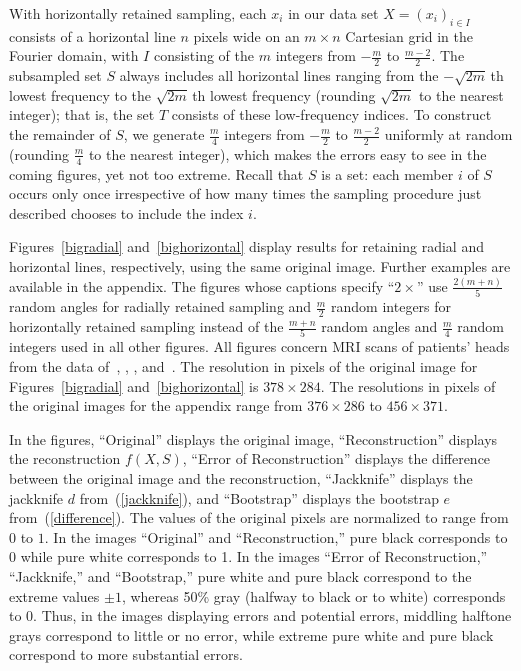 \documentclass{article}
\begin{document}
With horizontally retained sampling,
each $x_i$ in our data set $X = (x_i)_{i \in I}$
consists of a horizontal line $n$ pixels wide on an $m \times n$ Cartesian grid
in the Fourier domain, with $I$ consisting of the $m$ integers
from $-\frac{m}{2}$ to $\frac{m-2}{2}$.
The subsampled set $S$ always includes
all horizontal lines ranging from the $-\sqrt{2m}\,$th lowest frequency
to the $\sqrt{2m}\,$th lowest frequency
(rounding $\sqrt{2m}$ to the nearest integer);
that is, the set $T$ consists of these low-frequency indices.
To construct the remainder of $S$, we generate $\frac{m}{4}$ integers
from $-\frac{m}{2}$ to $\frac{m-2}{2}$ uniformly at random
(rounding $\frac{m}{4}$ to the nearest integer), which makes the errors
easy to see in the coming figures, yet not too extreme.
Recall that $S$ is a set: each member $i$ of $S$
occurs only once irrespective of how many times the sampling procedure
just described chooses to include the index $i$.

Figures~\ref{bigradial} and~\ref{bighorizontal} display results for retaining
radial and horizontal lines, respectively, using the same original image.
Further examples are available in the appendix.
The figures whose captions specify ``$2\times$'' use
$\frac{2(m + n)}{5}$ random angles for radially retained sampling
and $\frac{m}{2}$ random integers for horizontally retained sampling
instead of the $\frac{m + n}{5}$ random angles
and $\frac{m}{4}$ random integers used in all other figures.
All figures concern MRI scans of patients' heads from the data
of~\cite{mri2}, \cite{mri1}, \cite{mri3}, and~\cite{mri4}.
The resolution in pixels of the original image for Figures~\ref{bigradial}
and~\ref{bighorizontal} is $378 \times 284$.
The resolutions in pixels of the original images for the appendix range
from $376 \times 286$ to $456 \times 371$.

In the figures,
``Original'' displays the original image,
``Reconstruction'' displays the reconstruction $f(X, S)$,
``Error of Reconstruction'' displays the difference between the original image
and the reconstruction,
``Jackknife'' displays the jackknife $d$ from~(\ref{jackknife}),
and ``Bootstrap'' displays the bootstrap $e$ from~(\ref{difference}).
The values of the original pixels are normalized to range from $0$ to $1$.
In the images ``Original'' and ``Reconstruction,''
pure black corresponds to 0 while pure white corresponds to 1.
In the images ``Error of Reconstruction,'' ``Jackknife,'' and ``Bootstrap,''
pure white and pure black correspond to the extreme values $\pm 1$,
whereas 50\% gray (halfway to black or to white) corresponds to 0.
Thus, in the images displaying errors and potential errors,
middling halftone grays correspond to little or no error, while
extreme pure white and pure black correspond to more substantial errors.
\end{document}
